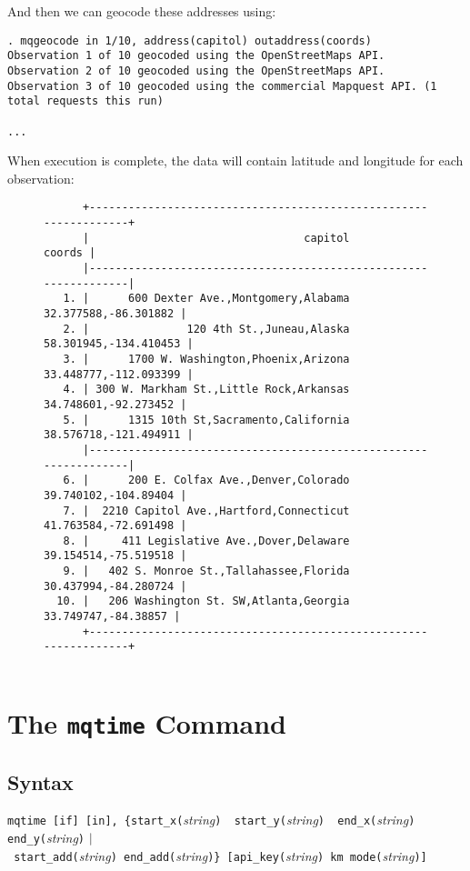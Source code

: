 \documentclass[11pt]{article}
\begin{document}
And then we can geocode these addresses using: 
\begin{verbatim}
. mqgeocode in 1/10, address(capitol) outaddress(coords)
Observation 1 of 10 geocoded using the OpenStreetMaps API.
Observation 2 of 10 geocoded using the OpenStreetMaps API.
Observation 3 of 10 geocoded using the commercial Mapquest API. (1 total requests this run)

...
\end{verbatim}
When execution is complete, the data will contain latitude and longitude for each observation:
\begin{figure}[ht]
\begin{verbatim}
      +-----------------------------------------------------------------+
      |                                 capitol                  coords |
      |-----------------------------------------------------------------|
   1. |      600 Dexter Ave.,Montgomery,Alabama    32.377588,-86.301882 |
   2. |               120 4th St.,Juneau,Alaska   58.301945,-134.410453 |
   3. |      1700 W. Washington,Phoenix,Arizona   33.448777,-112.093399 |
   4. | 300 W. Markham St.,Little Rock,Arkansas    34.748601,-92.273452 |
   5. |      1315 10th St,Sacramento,California   38.576718,-121.494911 |
      |-----------------------------------------------------------------|
   6. |      200 E. Colfax Ave.,Denver,Colorado    39.740102,-104.89404 |
   7. |  2210 Capitol Ave.,Hartford,Connecticut    41.763584,-72.691498 |
   8. |     411 Legislative Ave.,Dover,Delaware    39.154514,-75.519518 |
   9. |   402 S. Monroe St.,Tallahassee,Florida    30.437994,-84.280724 |
  10. |   206 Washington St. SW,Atlanta,Georgia     33.749747,-84.38857 |
      +-----------------------------------------------------------------+
 
\end{verbatim}
\end{figure}

\section{The \texttt{mqtime} Command}

\subsection{Syntax}

\verb|mqtime [if] [in], {start_x(|\textit{string}\verb|)  start_y(|\textit{string}\verb|)  end_x(|\textit{string}\verb|)  end_y(|\textit{string}\verb|)| $\arrowvert$ \\\verb| start_add(|\textit{string}\verb|) end_add(|\textit{string}\verb|)} [api_key(|\textit{string}\verb|) km mode(|\textit{string}\verb|)]|
\end{document}
